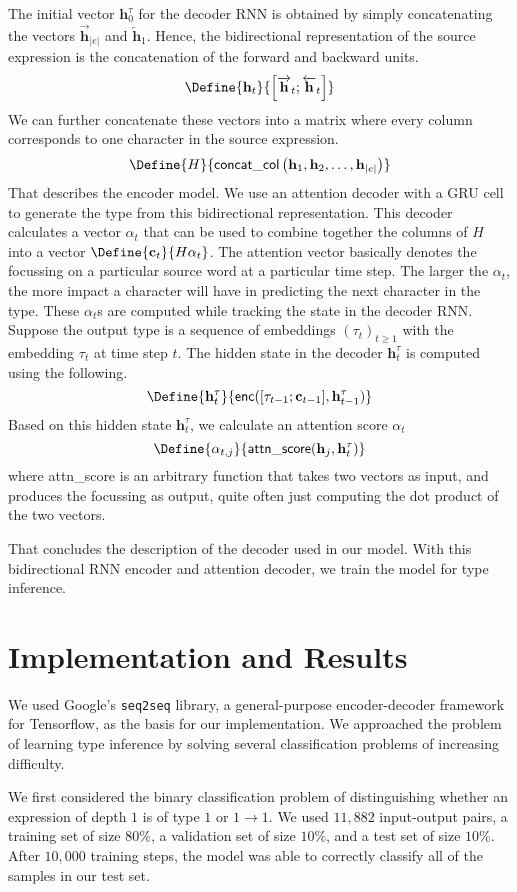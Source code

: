 \documentclass[twocolumn,9pt]{article}
\theoremstyle{definition}
\theoremstyle{remark}
\numberwithin{equation}{section}
\newcommand\Abs[1]{\left\vert{#1}\right\vert}
\newcommand\Squares[1]{\left[#1\right]}
\newcommand{\Ht}[1]{\mathbf{h}_{#1}}
\newcommand{\Htf}[1]{\overrightarrow{\mathbf{h}}_{#1}}
\newcommand{\Htb}[1]{\overleftarrow{\mathbf{h}}_{#1}}
\newcommand{\Htd}[1]{\mathbf{h}^{\tau}_{#1}}
\newcommand{\Al}[1]{\alpha_{#1}}
\begin{document}
The initial vector $\Htd{0}$ for the decoder RNN is obtained by simply
concatenating the vectors $\Htf{\Abs{e}}$ and $\Htb{1}$. Hence, the
bidirectional representation of the source expression is the
concatenation of the forward and backward units.
\[
  \Define{
    \Ht{t}
  }{
    \Squares{\Htf{t} ; \Htb{t}}
  }
\]
We can further concatenate these vectors into a matrix where every
column corresponds to one character in the source expression.
\[
  \Define{H}{
    \mathsf{concat\_col}\left(\Ht{1}, \Ht{2}, \ldots, \Ht{\Abs{e}}\right)
  }
\]
That describes the encoder model. We use an attention decoder
with a GRU cell to generate
the type from this bidirectional representation. This decoder calculates
a vector $\Al{t}$ that can be used to combine together the columns of $H$
into a vector $\Define{\mathbf{c}_t}{H \Al{t}}$. The attention vector basically denotes
the focussing on a particular source word at a particular time step. The larger
the $\Al{t}$, the more impact a character will have in predicting the next
character in the type. These $\Al{t}$s are computed while tracking the state
in the decoder RNN. Suppose the output type is a sequence of embeddings
${(\tau_t)}_{t \geq 1}$ with the embedding $\tau_t$ at time step $t$.
The hidden state in the decoder $\Htd{t}$ is computed
using the following.
\[
\Define{\Htd{t}}{\mathsf{enc}([\tau_{t-1} ; \mathbf{c}_{t-1}], \Htd{t-1})}
\]
Based on this hidden state $\Htd{t}$, we calculate an attention score $\Al{t}$
\[
\Define{\Al{t, j}}{\mathsf{attn\_score}(\Ht{j}, \Htd{t})}
\]
where attn\_score is an arbitrary function that takes two vectors as input,
and produces the focussing as output, quite often just computing the dot
product of the two vectors.

That concludes the description of the decoder used in our model. With this
bidirectional RNN encoder and attention decoder, we train the model for
type inference.

\section{Implementation and Results}

We used Google's \texttt{seq2seq} library, a general-purpose
encoder-decoder framework for Tensorflow, as the basis for our
implementation. We approached the problem of learning type inference by
solving several classification problems of increasing difficulty.

We first considered the binary classification problem of distinguishing
whether an expression of depth $1$ is of type $1$ or $1 \to 1$. We used
$11,882$ input-output pairs, a training set of size $80\%$, a validation
set of size $10\%$, and a test set of size $10\%$. After $10,000$
training steps, the model was able to correctly classify all of the
samples in our test set.
\end{document}
